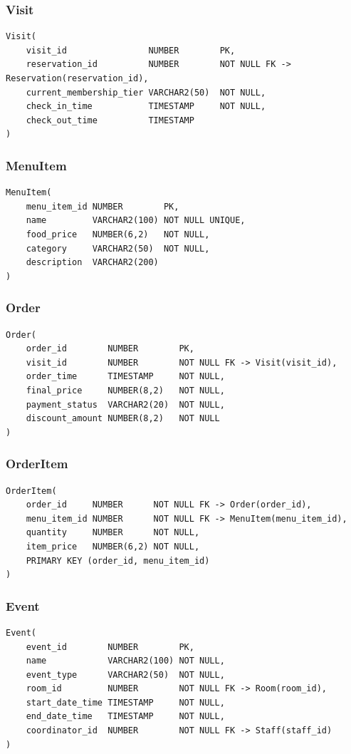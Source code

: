 \documentclass[11pt]{article}
\begin{document}
\subsubsection*{Visit}
\begin{verbatim}
Visit(
    visit_id                NUMBER        PK,
    reservation_id          NUMBER        NOT NULL FK -> Reservation(reservation_id),
    current_membership_tier VARCHAR2(50)  NOT NULL,
    check_in_time           TIMESTAMP     NOT NULL,
    check_out_time          TIMESTAMP
)
\end{verbatim}

\subsubsection*{MenuItem}
\begin{verbatim}
MenuItem(
    menu_item_id NUMBER        PK,
    name         VARCHAR2(100) NOT NULL UNIQUE,
    food_price   NUMBER(6,2)   NOT NULL,
    category     VARCHAR2(50)  NOT NULL,
    description  VARCHAR2(200)
)
\end{verbatim}

\subsubsection*{Order}
\begin{verbatim}
Order(
    order_id        NUMBER        PK,
    visit_id        NUMBER        NOT NULL FK -> Visit(visit_id),
    order_time      TIMESTAMP     NOT NULL,
    final_price     NUMBER(8,2)   NOT NULL,
    payment_status  VARCHAR2(20)  NOT NULL,
    discount_amount NUMBER(8,2)   NOT NULL
)
\end{verbatim}

\subsubsection*{OrderItem}
\begin{verbatim}
OrderItem(
    order_id     NUMBER      NOT NULL FK -> Order(order_id),
    menu_item_id NUMBER      NOT NULL FK -> MenuItem(menu_item_id),
    quantity     NUMBER      NOT NULL,
    item_price   NUMBER(6,2) NOT NULL,
    PRIMARY KEY (order_id, menu_item_id)
)
\end{verbatim}

\subsubsection*{Event}
\begin{verbatim}
Event(
    event_id        NUMBER        PK,
    name            VARCHAR2(100) NOT NULL,
    event_type      VARCHAR2(50)  NOT NULL,
    room_id         NUMBER        NOT NULL FK -> Room(room_id),
    start_date_time TIMESTAMP     NOT NULL,
    end_date_time   TIMESTAMP     NOT NULL,
    coordinator_id  NUMBER        NOT NULL FK -> Staff(staff_id)
)
\end{verbatim}
\end{document}
